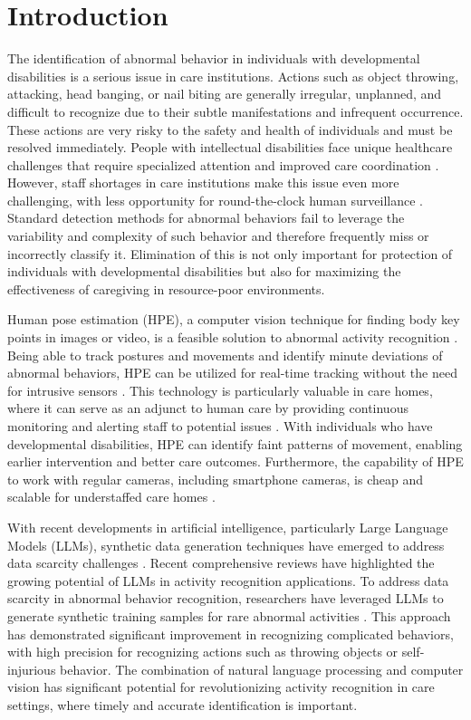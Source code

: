 \documentclass{iopconfser}
\begin{document}
\section{Introduction}

The identification of abnormal behavior in individuals with developmental disabilities is a serious issue in care institutions. Actions such as object throwing, attacking, head banging, or nail biting are generally irregular, unplanned, and difficult to recognize due to their subtle manifestations and infrequent occurrence. These actions are very risky to the safety and health of individuals and must be resolved immediately. People with intellectual disabilities face unique healthcare challenges that require specialized attention and improved care coordination \cite{ashok2023challenges}. However, staff shortages in care institutions make this issue even more challenging, with less opportunity for round-the-clock human surveillance \cite{buntinx2010models,emerson2014health}. Standard detection methods for abnormal behaviors fail to leverage the variability and complexity of such behavior and therefore frequently miss or incorrectly classify it. Elimination of this is not only important for protection of individuals with developmental disabilities but also for maximizing the effectiveness of caregiving in resource-poor environments.

Human pose estimation (HPE), a computer vision technique for finding body key points in images or video, is a feasible solution to abnormal activity recognition \cite{ke2013review,inoue2019integrating}. Being able to track postures and movements and identify minute deviations of abnormal behaviors, HPE can be utilized for real-time tracking without the need for intrusive sensors \cite{morais2019learning}. This technology is particularly valuable in care homes, where it can serve as an adjunct to human care by providing continuous monitoring and alerting staff to potential issues \cite{wang2019deep}. With individuals who have developmental disabilities, HPE can identify faint patterns of movement, enabling earlier intervention and better care outcomes. Furthermore, the capability of HPE to work with regular cameras, including smartphone cameras, is cheap and scalable for understaffed care homes \cite{ordonez2016deep}.

With recent developments in artificial intelligence, particularly Large Language Models (LLMs), synthetic data generation techniques have emerged to address data scarcity challenges \cite{wang2019deep}. Recent comprehensive reviews \cite{ordonez2016deep} have highlighted the growing potential of LLMs in activity recognition applications. To address data scarcity in abnormal behavior recognition, researchers have leveraged LLMs to generate synthetic training samples for rare abnormal activities \cite{wang2019deep}. This approach has demonstrated significant improvement in recognizing complicated behaviors, with high precision for recognizing actions such as throwing objects or self-injurious behavior. The combination of natural language processing and computer vision has significant potential for revolutionizing activity recognition in care settings, where timely and accurate identification is important.
\end{document}

